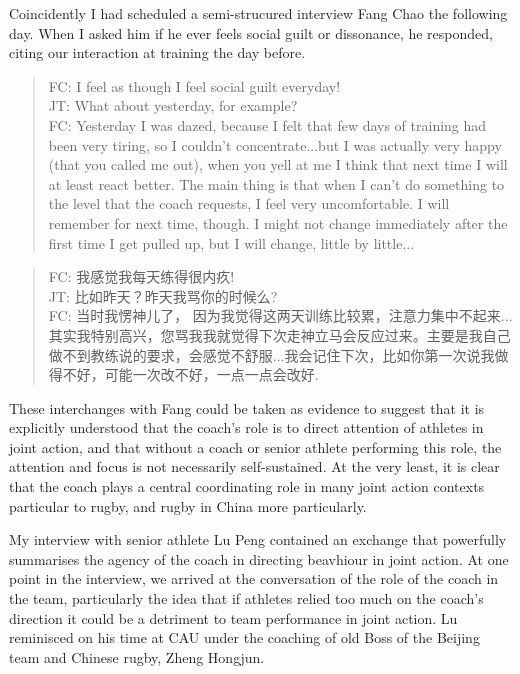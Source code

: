 \begin{CJK}{UTF8}{gbsn}
Coincidently I had scheduled a semi-strucured interview Fang Chao the following day. When I asked him if he ever feels social guilt or dissonance, he responded, citing our interaction at training the day before.

    \begin{quotation}
      FC: I feel as though I feel social guilt everyday! \\
      JT: What about yesterday, for example? \\
      FC: Yesterday I was dazed, because I felt that few days of training had been very tiring, so I couldn't concentrate...but I was actually very happy (that you called me out), when you yell at me I think that next time I will at least react better.  The main thing is that when I can't do something to the level that the coach requests, I feel very uncomfortable.  I will remember for next time, though.  I might not change immediately after the first time I get pulled up, but I will change, little by little... \\
    \end{quotation}

    \begin{quotation}
      FC: 我感觉我每天练得很内疚! \\
      JT: 比如昨天？昨天我骂你的时候么? \\
      FC: 当时我愣神儿了， 因为我觉得这两天训练比较累，注意力集中不起来...其实我特别高兴，您骂我我就觉得下次走神立马会反应过来。主要是我自己做不到教练说的要求，会感觉不舒服...我会记住下次，比如你第一次说我做得不好，可能一次改不好，一点一点会改好.
    \end{quotation}

These interchanges with Fang could be taken as evidence to suggest that it is explicitly understood that the coach's role is to direct attention of athletes in joint action, and that without a coach or senior athlete performing this role, the attention and focus is not necessarily self-sustained. At the very least, it is clear that the coach plays a central coordinating role in many joint action contexts particular to rugby, and rugby in China more particularly.


My interview with senior athlete Lu Peng contained an exchange that powerfully summarises the agency of the coach in directing beavhiour in joint action.  At one point in the interview, we arrived at the conversation of the role of the coach in the team, particularly the idea that if athletes relied too much on the coach's direction it could be a detriment to team performance in joint action.  Lu reminisced on his time at CAU under the coaching of old Boss of the Beijing team and Chinese rugby, Zheng Hongjun.


\end{CJK}
